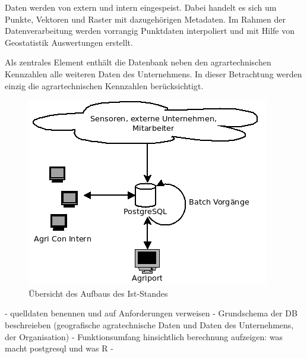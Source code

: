 Daten werden von extern und intern eingespeist.
Dabei handelt es sich um Punkte, Vektoren und Raster mit dazugehörigen Metadaten.
Im Rahmen der Datenverarbeitung werden vorrangig Punktdaten interpoliert und mit Hilfe von Geostatistik Auswertungen erstellt.

Als zentrales Element enthält die Datenbank neben den agrartechnischen Kennzahlen alle weiteren Daten des Unternehmens. In dieser Betrachtung werden einzig die agrartechnischen Kennzahlen berücksichtigt.

\begin{figure}[h]
\centering
\includegraphics[width=.8\textwidth]{Abbildungen/Ist-Stand.png}
\caption[Aufbau Ist-Stand]{\"{U}bersicht des Aufbaus des Ist-Standes}
\label{fig:iststand}
\end{figure}


- quelldaten benennen und auf Anforderungen verweisen
- Grundschema der DB beschreieben (geografische agratechnische Daten und Daten des Unternehmens, der Organisation)
- Funktionsumfang hinsichtlich berechnung aufzeigen: was macht postgresql und was R
- 
